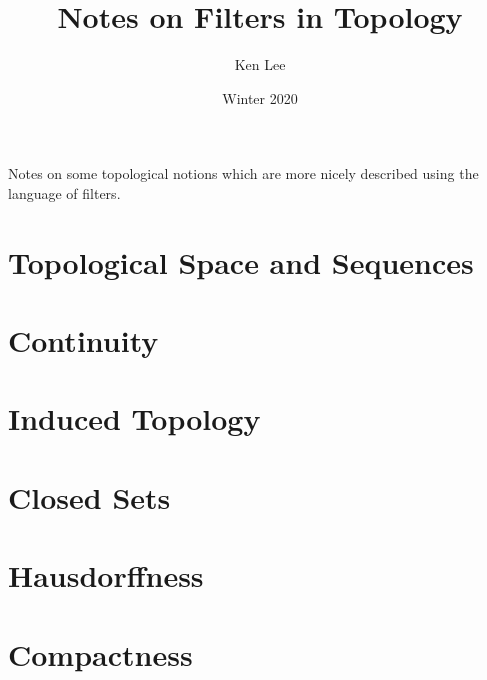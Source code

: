 \documentclass{article}
\begin{document}
\title{Notes on Filters in Topology}

\author{Ken Lee}
\date{Winter 2020}
\maketitle

Notes on some topological notions which are 
more nicely described using the language of filters. 
\tableofcontents
\section{Topological Space and Sequences}
\section{Continuity}
\section{Induced Topology}
\section{Closed Sets}
\section{Hausdorffness}
\section{Compactness}
\end{document}
